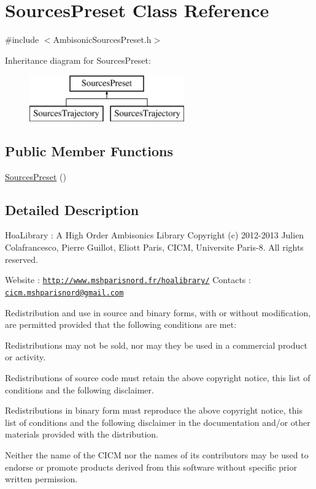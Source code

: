 \hypertarget{class_sources_preset}{\section{Sources\-Preset Class Reference}
\label{class_sources_preset}
}


{\ttfamily \#include $<$Ambisonic\-Sources\-Preset.\-h$>$}

Inheritance diagram for Sources\-Preset\-:\begin{figure}[H]
\begin{center}
\leavevmode
\includegraphics[height=2.000000cm]{class_sources_preset}
\end{center}
\end{figure}
\subsection*{Public Member Functions}
\begin{DoxyCompactItemize}
\item 
\hyperlink{class_sources_preset_a0a4203349327d10bb6afe35156126d8a}{Sources\-Preset} ()
\end{DoxyCompactItemize}


\subsection{Detailed Description}
Hoa\-Library \-: A High Order Ambisonics Library Copyright (c) 2012-\/2013 Julien Colafrancesco, Pierre Guillot, Eliott Paris, C\-I\-C\-M, Universite Paris-\/8. All rights reserved.

Website \-: \href{http://www.mshparisnord.fr/hoalibrary/}{\tt http\-://www.\-mshparisnord.\-fr/hoalibrary/} Contacts \-: \href{mailto:cicm.mshparisnord@gmail.com}{\tt cicm.\-mshparisnord@gmail.\-com}

Redistribution and use in source and binary forms, with or without modification, are permitted provided that the following conditions are met\-:


\begin{DoxyItemize}
\item Redistributions may not be sold, nor may they be used in a commercial product or activity.
\item Redistributions of source code must retain the above copyright notice, this list of conditions and the following disclaimer.
\item Redistributions in binary form must reproduce the above copyright notice, this list of conditions and the following disclaimer in the documentation and/or other materials provided with the distribution.
\item Neither the name of the C\-I\-C\-M nor the names of its contributors may be used to endorse or promote products derived from this software without specific prior written permission.
\end{DoxyItemize}

